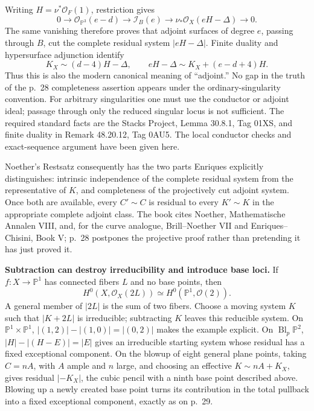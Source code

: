 Writing \(H=\nu^*\mathcal O_F(1)\), restriction gives \[
0\longrightarrow\mathcal O_{\mathbb P^3}(e-d)
\longrightarrow\mathcal I_B(e)
\longrightarrow\nu_*\mathcal O_X(eH-\Delta)
\longrightarrow0.
\] The same vanishing therefore proves that adjoint surfaces of degree \(e\), passing through \(B\), cut the complete residual system \(|eH-\Delta|\). Finite duality and hypersurface adjunction identify \[
K_X\sim(d-4)H-\Delta,\qquad
eH-\Delta\sim K_X+(e-d+4)H.
\] Thus this is also the modern canonical meaning of ``adjoint.'' No gap in the truth of the p.~28 completeness assertion appears under the ordinary-singularity convention. For arbitrary singularities one must use the conductor or adjoint ideal; passage through only the reduced singular locus is not sufficient. The required standard facts are the Stacks Project, Lemma 30.8.1, Tag 01XS, and finite duality in Remark 48.20.12, Tag 0AU5. The local conductor checks and exact-sequence argument have been given here.

Noether's Restsatz consequently has the two parts Enriques explicitly distinguishes: intrinsic independence of the complete residual system from the representative of \(K\), and completeness of the projectively cut adjoint system. Once both are available, every \(C'\sim C\) is residual to every \(K'\sim K\) in the appropriate complete adjoint class. The book cites Noether, Mathematische Annalen VIII, and, for the curve analogue, Brill--Noether VII and Enriques--Chisini, Book V; p.~28 postpones the projective proof rather than pretending it has just proved it.

\textbf{Subtraction can destroy irreducibility and introduce base loci.} If \(f:X\to\mathbb P^1\) has connected fibers \(L\) and no base points, then \[
H^0(X,\mathcal O_X(2L))\simeq H^0(\mathbb P^1,\mathcal O(2)).
\] A general member of \(|2L|\) is the sum of two fibers. Choose a moving system \(K\) such that \(|K+2L|\) is irreducible; subtracting \(K\) leaves this reducible system. On \(\mathbb P^1\times\mathbb P^1\), \(|(1,2)|-|(1,0)|=|(0,2)|\) makes the example explicit. On \(\operatorname{Bl}_p\mathbb P^2\), \(|H|-|(H-E)|=|E|\) gives an irreducible starting system whose residual has a fixed exceptional component. On the blowup of eight general plane points, taking \(C=nA\), with \(A\) ample and \(n\) large, and choosing an effective \(K\sim nA+K_X\), gives residual \(|-K_X|\), the cubic pencil with a ninth base point described above. Blowing up a newly created base point turns its contribution in the total pullback into a fixed exceptional component, exactly as on p.~29.

